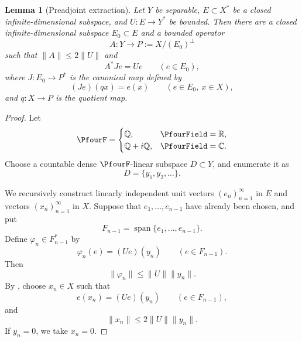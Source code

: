 \documentclass[11pt,reqno]{amsart}
\makeatletter
\theoremstyle{plain}
\newtheorem{lemma}[lemma]{Lemma}
\theoremstyle{definition}
\newcommand{\R}{\mathbb R}
\newcommand{\C}{\mathbb C}
\newcounter{problempaper}
\newenvironment{problempaperbody}{%
  \setcounter{subsection}{0}%
  \setcounter{subsubsection}{0}%
  \setcounter{paragraph}{0}%
  \renewcommand{\thesubsection}{\arabic{subsection}}%
  \renewcommand{\thesubsubsection}{\thesubsection.\arabic{subsubsection}}%
  \renewcommand{\theparagraph}{\thesubsubsection.\arabic{paragraph}}%
  \let\problem@outersection\section
  \let\problem@outersubsection\subsection
  \let\problem@outersubsubsection\subsubsection
  \let\problem@outerparagraph\paragraph
  \let\section\problem@papersection
  \let\subsection\problem@papersubsection
  \let\subsubsection\problem@papersubsubsection
}{%
  \let\section\problem@outersection
  \let\subsection\problem@outersubsection
  \let\subsubsection\problem@outersubsubsection
  \let\paragraph\problem@outerparagraph
}
\newcommand{\problem@target}[2]{%
  \hypertarget{problem-\theproblempaper-#1-#2}{}%
}
\newcommand{\problem@paperheading}[3]{%
  \par\bigskip
  \problem@target{#1}{#2}%
  \noindent{\large\bfseries #2.\quad #3\par}%
  \nobreak\smallskip
}
\newcommand{\problem@papersubheading}[3]{%
  \par\medskip
  \problem@target{#1}{#2}%
  \noindent{\normalsize\bfseries #2.\quad #3\par}%
  \nobreak\smallskip
}
\newcommand{\problem@papersubsubheading}[3]{%
  \par\smallskip
  \problem@target{#1}{#2}%
  \noindent{\normalsize\itshape #2.\quad #3.\ }%
}
\def\problem@papersection{%
  \@ifstar{\problem@papersectionstar}{\problem@papersectionnostar}%
}
\def\problem@papersectionstar#1{%
  \par\bigskip\noindent{\large\bfseries #1\par}\nobreak\smallskip
}
\def\problem@papersectionnostar#1{%
  \refstepcounter{subsection}%
  \setcounter{subsubsection}{0}%
  \setcounter{paragraph}{0}%
  \problem@paperheading{section}{\thesubsection}{#1}%
  \problem@writecontentsline{section}{\thesubsection}{#1}%
}
\def\problem@papersubsection{%
  \@ifstar{\problem@papersubsectionstar}{\problem@papersubsectionnostar}%
}
\def\problem@papersubsectionstar#1{%
  \par\medskip\noindent{\normalsize\bfseries #1\par}\nobreak\smallskip
}
\def\problem@papersubsectionnostar#1{%
  \refstepcounter{subsubsection}%
  \setcounter{paragraph}{0}%
  \problem@papersubheading{subsection}{\thesubsubsection}{#1}%
  \problem@writecontentsline{subsection}{\thesubsubsection}{#1}%
}
\def\problem@papersubsubsection{%
  \@ifstar{\problem@papersubsubsectionstar}{\problem@papersubsubsectionnostar}%
}
\def\problem@papersubsubsectionstar#1{%
  \par\smallskip\noindent{\normalsize\itshape #1.\ }%
}
\def\problem@papersubsubsectionnostar#1{%
  \refstepcounter{paragraph}%
  \problem@papersubsubheading{subsubsection}{\theparagraph}{#1}%
  \problem@writecontentsline{subsubsection}{\theparagraph}{#1}%
}
\newcommand{\problem@writecontentsline}[3]{%
  \begingroup
  \protected@write\@auxout{}{%
    \string\problemcontentsentry{\theproblempaper}{#1}{#2}{#3}{\thepage}%
  }%
  \endgroup
}
\newcommand{\problemcontentsentry}[5]{%
  \@ifundefined{problemcontents@#1}{%
    \expandafter\gdef\csname problemcontents@#1\endcsname{}%
  }{}%
  \expandafter\g@addto@macro\csname problemcontents@#1\endcsname{%
    \problemcontentsline{#1}{#2}{#3}{#4}{#5}%
  }%
}
\newcommand{\problemcontentslink}[4]{%
  \hyperlink{problem-#1-#2-#3}{#4}%
}
\newcommand{\problemcontentsline}[5]{%
  \ifstrequal{#2}{section}{%
    \par\noindent
    \problemcontentslink{#1}{#2}{#3}{\makebox[2.5em][l]{#3}#4}%
    \nobreak\dotfill
    \problemcontentslink{#1}{#2}{#3}{#5}\par
  }{%
    \ifstrequal{#2}{subsection}{%
      \par\noindent\hspace*{1.5em}%
      \problemcontentslink{#1}{#2}{#3}{\makebox[3.5em][l]{#3}#4}%
      \nobreak\dotfill
      \problemcontentslink{#1}{#2}{#3}{#5}\par
    }{%
      \par\noindent\hspace*{3em}%
      \problemcontentslink{#1}{#2}{#3}{\makebox[4.5em][l]{#3}#4}%
      \nobreak\dotfill
      \problemcontentslink{#1}{#2}{#3}{#5}\par
    }%
  }%
}
\makeatother
\begin{document}
\begin{problempaperbody}
\begin{lemma}[Preadjoint extraction]
\label{p4:lem:preadjoint-extraction}
Let $Y$ be separable, $E\subset X^*$ be a closed infinite-dimensional subspace, and $U \colon E\to Y^*$ be bounded. Then there are a closed infinite-dimensional subspace $E_0\subset E$ and a bounded operator
\begin{equation*}
        A\colon Y\to P:=X/(E_0)^\perp
\end{equation*}
such that $\|A\|\leq 2\|U\|$ and
\begin{equation}
\label{p4:eq:preadjoint-identity}
        A^*J e=Ue \qquad(e\in E_0),
\end{equation}
where $J \colon E_0\to P^*$ is the canonical map defined by
\begin{equation*}
        (Je)(qx)=e(x) \qquad(e\in E_0,\ x\in X),
\end{equation*}
and $q \colon X\to P$ is the quotient map.
\end{lemma}

\begin{proof}
Let
\begin{equation*}
        \PfourF=
        \begin{cases}
        \mathbb Q, & \PfourField=\R,\\
        \mathbb Q+i\mathbb Q, & \PfourField=\C.
        \end{cases}
\end{equation*}
Choose a countable dense $\PfourF$-linear subspace $D\subset Y$, and enumerate it as
\begin{equation*}
        D=\{y_1,y_2,\ldots\}.
\end{equation*}

We recursively construct linearly independent unit vectors $(e_n)_{n=1}^{\infty}$ in $E$ and vectors $(x_n)_{n=1}^{\infty}$ in $X$. Suppose that $e_1,\ldots,e_{n-1}$ have already been chosen, and put
\begin{equation*}
        F_{n-1}=\operatorname{span}\{e_1,\ldots,e_{n-1}\}.
\end{equation*}
Define $\varphi_n\in F_{n-1}^*$ by
\begin{equation*}
        \varphi_n(e)=(Ue)(y_n) \qquad(e\in F_{n-1}).
\end{equation*}
Then
\begin{equation*}
        \|\varphi_n\|\leq \|U\|\|y_n\|.
\end{equation*}
By , choose $x_n\in X$ such that
\begin{equation}
\label{p4:eq:interpolation-step}
        e(x_n)=(Ue)(y_n) \qquad(e\in F_{n-1}),
\end{equation}
and
\begin{equation}
\label{p4:eq:xn-bound}
        \|x_n\|\leq 2\|U\|\|y_n\|.
\end{equation}
If $y_n=0$, we take $x_n=0$.


\end{proof}
\end{problempaperbody}
\end{document}
